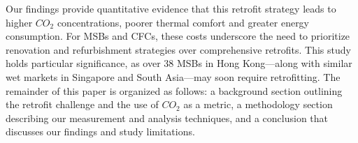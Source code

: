 \documentclass[preprint,12pt]{elsarticle}
\begin{document}

Our findings provide quantitative evidence that this retrofit strategy leads to higher $CO_2$ concentrations\cite{7}, poorer thermal comfort and greater energy consumption\cite{8,9}. For MSBs and CFCs, these costs underscore the need to prioritize renovation and refurbishment strategies over comprehensive retrofits. This study holds particular significance, as over 38 MSBs in Hong Kong—along with similar wet markets in Singapore and South Asia—may soon require retrofitting. The remainder of this paper is organized as follows: a background section outlining the retrofit challenge and the use of $CO_2$ as a metric, a methodology section describing our measurement and analysis techniques, and a conclusion that discusses our findings and study limitations.


\end{document}
